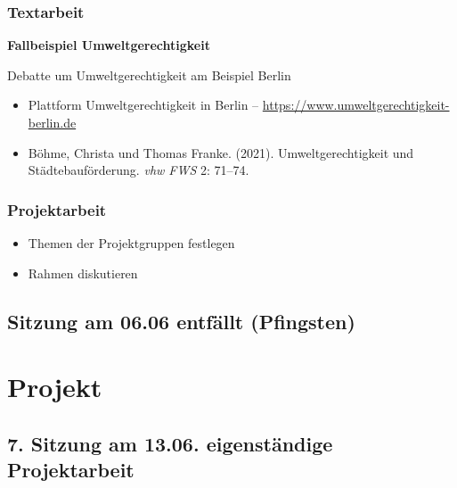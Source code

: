 \documentclass[
  ngerman,
]{article}
\providecommand{\tightlist}{%
  \setlength{\itemsep}{0pt}\setlength{\parskip}{0pt}}
\begin{document}
\hypertarget{textarbeit-5}{%
\subsubsection*{Textarbeit}\label{textarbeit-5}}

\textbf{Fallbeispiel Umweltgerechtigkeit}

Debatte um Umweltgerechtigkeit am Beispiel Berlin

\begin{itemize}
\tightlist
\item
  Plattform Umweltgerechtigkeit in Berlin -- \url{https://www.umweltgerechtigkeit-berlin.de}
\item
  Böhme, Christa und Thomas Franke. (2021). Umweltgerechtigkeit und Städtebauförderung. \emph{vhw FWS} 2: 71--74.
\end{itemize}

\hypertarget{projektarbeit-4}{%
\subsubsection*{Projektarbeit}\label{projektarbeit-4}}

\begin{itemize}
\tightlist
\item
  Themen der Projektgruppen festlegen
\item
  Rahmen diskutieren
\end{itemize}

\hypertarget{sitzung-am-06.06-entfuxe4llt-pfingsten}{%
\subsection*{Sitzung am 06.06 entfällt (Pfingsten)}\label{sitzung-am-06.06-entfuxe4llt-pfingsten}}

\hypertarget{projekt}{%
\section*{Projekt}\label{projekt}}

\hypertarget{sitzung-am-13.06.-eigenstuxe4ndige-projektarbeit}{%
\subsection*{7. Sitzung am 13.06. \textbar{} eigenständige Projektarbeit}\label{sitzung-am-13.06.-eigenstuxe4ndige-projektarbeit}}
\end{document}
